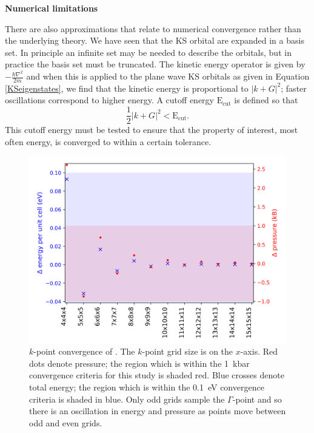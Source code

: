 \textbf{Numerical limitations} 

There are also approximations that relate to numerical convergence rather than the underlying theory.
We have seen that the KS orbital are expanded in a basis set. In principle an infinite set may be needed to describe the orbitals, but in practice the basis set must be truncated. The kinetic energy operator is given by $-\frac{\hbar \nabla^2}{2m}$ and when this is applied to the plane wave KS orbitals as given in Equation \ref{KSeigenstates}, we find that the kinetic energy is proportional to $|k+G|^2$; faster oscillations correspond to higher energy. A cutoff energy $\textrm{E}_\textrm{cut}$ is defined so that
\begin{equation}
\frac{1}{2}|k+G|^2 < \textrm{E}_\textrm{cut}.
\end{equation}
This cutoff energy must be tested to ensure that the property of interest, most often energy, is converged to within a certain tolerance.

\begin{figure}[h]
\centering
  \includegraphics[width=0.7\columnwidth]{figures/ch3/kpointconvergence.png}
  \caption[ $k$-point convergence]{$k$-point convergence of . The $k$-point grid size is on the $x$-axis. Red dots denote pressure; the region which is within the \SI{1}{\kilo\bar} convergence criteria for this study is shaded red. Blue crosses denote total energy; the region which is within the \SI{0.1}{\electronvolt} convergence criteria is shaded in blue. Only odd grids sample the $\Gamma$-point and so there is an oscillation in energy and pressure as points move between odd and even grids.}
  \label{kpointconvergence}
\end{figure}

